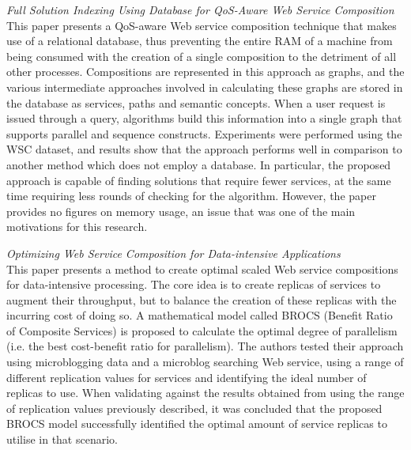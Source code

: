\textit{Full Solution Indexing Using Database for QoS-Aware Web Service Composition \cite{li2014full}}\\
This paper presents a QoS-aware Web service composition technique that makes use of a relational database, thus preventing the entire RAM of a machine from
being consumed with the creation of a single composition to the detriment of all other processes. Compositions are represented in this approach as graphs, and
the various intermediate approaches involved in calculating these graphs are stored in the database as services, paths and semantic concepts. When a user request
is issued through a query, algorithms build this information into a single graph that supports parallel and sequence constructs. Experiments were performed
using the WSC dataset, and results show that the approach performs well in comparison to another method which does not employ a database. In particular, the
proposed approach is capable of finding solutions that require fewer services, at the same time requiring less rounds of checking for the algorithm. However,
the paper provides no figures on memory usage, an issue that was one of the main motivations for this research.

\textit{Optimizing Web Service Composition for Data-intensive Applications \cite{yu2014optimizing}}\\
This paper presents a method to create optimal scaled Web service compositions for data-intensive processing.
The core idea is to create replicas of services to augment their throughput, but to balance the creation of
these replicas with the incurring cost of doing so. A mathematical model called BROCS (Benefit Ratio of Composite
Services) is proposed to calculate the optimal degree of parallelism (i.e. the best cost-benefit ratio for parallelism).
The authors tested their approach using microblogging data and a microblog searching Web service, using a range of
different replication values for services and identifying the ideal number of replicas to use. When validating against the
results obtained from using the range of replication values previously described, it was concluded that the proposed
BROCS model successfully identified the optimal amount of service replicas to utilise in that scenario.

